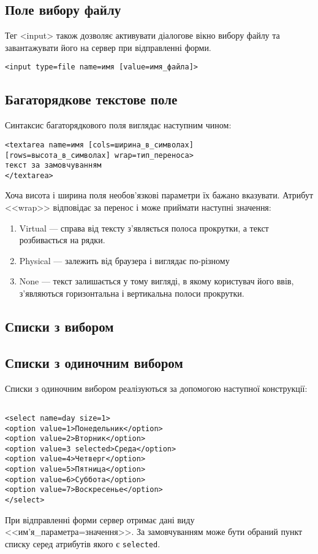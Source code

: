 \subsection*{Поле вибору файлу}

Тег <input> також дозволяє активувати діалогове вікно вибору файлу та завантажувати його на сервер при відправленні форми.
\begin{verbatim}
<input type=file name=имя [value=имя_файла]>
\end{verbatim}


\subsection{Багаторядкове текстове поле}
\label{tar-tag:app}
Синтаксис багаторядкового поля виглядає наступним чином:
\begin{verbatim}
<textarea name=имя [cols=ширина_в_символах] 
[rows=высота_в_символах] wrap=тип_переноса>
текст за замовчуванням
</textarea>
\end{verbatim}
Хоча висота і ширина поля необов'язкові параметри їх бажано вказувати. Атрибут <<wrap>> відповідає за перенос і може приймати наступні значення:
\begin{enumerate}
\item Virtual --- справа від тексту з'являється полоса прокрутки, а текст розбивається на рядки.
\item Physical --- залежить від браузера і виглядає по-різному
\item None --- текст залишається у тому вигляді, в якому користувач його ввів, з'являються горизонтальна і вертикальна полоси прокрутки.
\end{enumerate}

\subsection{Списки з вибором} \label{sel-tag:app}
\subsection*{Списки з одиночним вибором}
\label{sel-tag:app}
Списки з одиночним вибором реалізуються за допомогою наступної конструкції:
\begin{verbatim}

<select name=day size=1>
<option value=1>Понедельник</option>
<option value=2>Вторник</option>
<option value=3 selected>Среда</option>
<option value=4>Четверг</option>
<option value=5>Пятница</option>
<option value=6>Суббота</option>
<option value=7>Воскресенье</option>
</select>

\end{verbatim}
При відправленні форми сервер отримає дані виду <<им'я\_параметра=значення>>. За замовчуванням може бути обраний пункт списку серед атрибутів якого є \verb'selected'.

